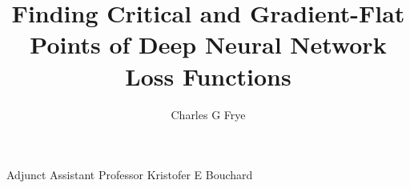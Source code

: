 
\title{Finding Critical and Gradient-Flat Points of Deep Neural Network Loss Functions}
\author{Charles G Frye}
{Adjunct Assistant Professor Kristofer E Bouchard}

\maketitle
\copyrightpage{}



